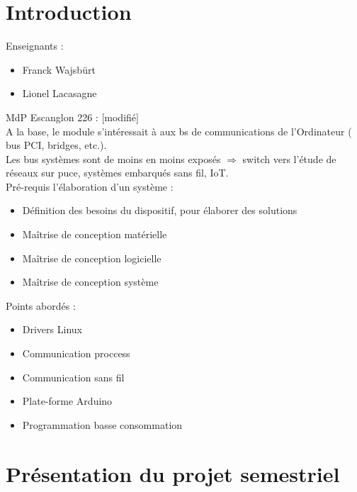 \section{Introduction}
Enseignants :
\begin{itemize}
  \item Franck Wajsbürt
  \item Lionel Lacasagne
\end{itemize}
MdP Escanglon 226 : [modifié]\\
A la base, le module s'intéressait à aux bs de communications de l'Ordinateur (
bus PCI, bridges, etc.).\\
Les bus systèmes sont de moins en moins exposés $\Rightarrow$ switch vers l'étude
de réseaux sur puce, systèmes embarqués sans fil, IoT.\\

Pré-requis l'élaboration d'un système :
\begin{itemize}
  \item Définition des besoins du dispositif, pour élaborer des solutions
  \item Maîtrise de conception matérielle
  \item Maîtrise de conception logicielle
  \item Maîtrise de conception système
\end{itemize}

Points abordés :
\begin{itemize}
  \item Drivers Linux
  \item Communication proccess
  \item Communication sans fil
  \item Plate-forme Arduino
  \item Programmation basse consommation
\end{itemize}

\section{Présentation du projet semestriel}

